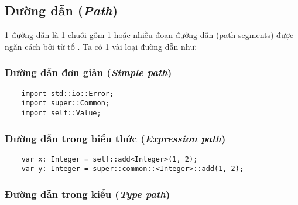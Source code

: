\subsection{Đường dẫn (\textit{Path})}

1 đường dẫn là 1 chuỗi gồm 1 hoặc nhiều đoạn đường dẫn (path segments) được ngăn cách bởi từ tố \kw{::}. Ta có 1 vài loại đường dẫn như:

\subsubsection{Đường dẫn đơn giản (\textit{Simple path})}

\regexsimplepath

\begin{lstlisting}
    import std::io::Error;
    import super::Common;
    import self::Value;
\end{lstlisting}

\subsubsection{Đường dẫn trong biểu thức (\textit{Expression path})}

\regexpathinexpr

\begin{lstlisting}
    var x: Integer = self::add<Integer>(1, 2);
    var y: Integer = super::common::<Integer>::add(1, 2);
\end{lstlisting}

\subsubsection{Đường dẫn trong kiểu (\textit{Type path})}

\regexpathintype
